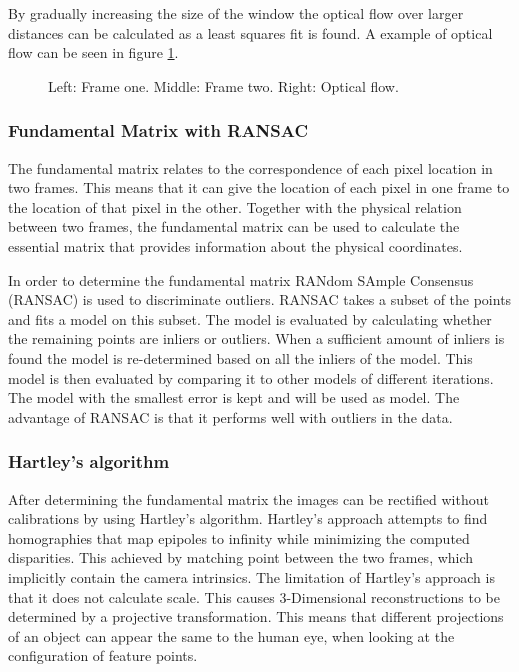 \documentclass[a4paper]{article}
\begin{document}
By gradually increasing the size of the window the optical flow over larger distances can be calculated as a least squares fit is found. A example of optical flow can be seen in figure \ref{opticflow}.

\begin{figure}[!ht]
\centering
\caption{Left: Frame one. Middle: Frame two. Right: Optical flow.}
\label{opticflow}
\end{figure}

\subsubsection{Fundamental Matrix with RANSAC}
The fundamental matrix relates to the correspondence of each pixel location in two frames. This means that it can give the location of each pixel in one frame to the location of that pixel in the other. Together with the physical relation between two frames, the fundamental matrix can be used to calculate the essential matrix that provides information about the physical coordinates.

In order to determine the fundamental matrix RANdom SAmple Consensus (RANSAC) is used to discriminate outliers. RANSAC takes a subset of the points and fits a model on this subset. The model is evaluated by calculating whether the remaining points are inliers or outliers. When a sufficient amount of inliers is found the model is re-determined based on all the inliers of the model. This model is then evaluated by comparing it to other models of different iterations. The model with the smallest error is kept and will be used as model. The advantage of RANSAC is that it performs well with outliers in the data.

\subsubsection{Hartley's algorithm}
After determining the fundamental matrix the images can be rectified without calibrations by using Hartley's algorithm. Hartley's approach attempts to find homographies \cite{Trucco1998} that map epipoles to infinity while minimizing the computed disparities. This achieved by matching point between the two frames, which implicitly contain the camera intrinsics. The limitation of Hartley's approach is that it does not calculate scale. This causes 3-Dimensional reconstructions to be determined by a projective transformation. This means 
that different projections of an object can appear the same to the human eye, when looking at the configuration of feature points.
\end{document}
